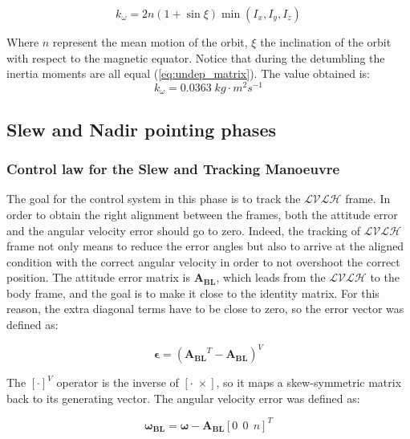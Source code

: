 \begin{equation}
    k_{\omega} = 2n (1 + \sin{\xi}) \min{\left( I_x, I_y, I_z \right)}
\end{equation}

Where $n$ represent the mean motion of the orbit, $\xi$ the inclination of the orbit with respect to the magnetic equator. Notice that  during the detumbling the inertia moments are all equal (\autoref{eq:undep_matrix}). The value obtained is:
\begin{equation*}
    k_{\omega} = 0.0363 \; kg\cdot m^2s^{-1}
\end{equation*}



\subsection{Slew and Nadir pointing phases}
\label{subsec:slew_subsec}

\subsubsection{Control law for the Slew and Tracking Manoeuvre}
\label{subsubsec:slew_nadir_law}

The goal for the control system in this phase is to track the $\mathcal{LVLH}$ frame. In order to obtain the right alignment between the frames, both the attitude error and the angular velocity error should go to zero. Indeed, the tracking of $\mathcal{LVLH}$ frame not only means to reduce the error angles but also to arrive at the aligned condition with the correct angular velocity in order to not overshoot the correct position. The attitude error matrix is $\boldsymbol{A_{BL}}$, which leads from the $\mathcal{LVLH}$ to the body frame, and the goal is to make it close to the identity matrix. For this reason, the extra diagonal terms have to be close to zero, so the error vector was defined as:

\begin{equation}
    \boldsymbol{\epsilon}=(\boldsymbol{A_{BL}}^T- \boldsymbol{A_{BL}})^V
\end{equation}

The $[\cdot]^V$ operator is the inverse of $[\cdot \; \times]$, so it maps a skew-symmetric matrix back to its generating vector. 
The angular velocity error was defined as:

\begin{equation}
    \label{eq:omega_bl_vec}
    \boldsymbol{\omega_{BL}}=\boldsymbol{\omega}-\boldsymbol{A_{BL}}[0 \ \ 0 \ \ n]^T
\end{equation}

